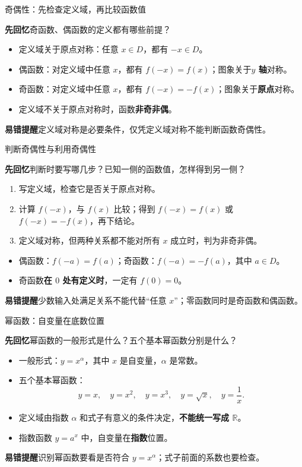\documentclass[UTF8,10pt,aspectratio=169,handout]{ctexbeamer}
\newcommand{\Recall}[1]{\par\noindent\textcolor{KnowledgeBlue}{\textbf{先回忆}\quad #1}\par\vspace{0.3cm}}
\newcommand{\Pitfall}[1]{\par\vspace{0.22cm}\noindent\textbf{易错提醒}\quad #1\par}
\begin{document}
\begin{frame}[t]{奇偶性：先检查定义域，再比较函数值}
\large
\Recall{奇函数、偶函数的定义都有哪些前提？}
\pause
\begin{itemize}
  \item 定义域关于原点对称：任意 $x\in D$，都有 $-x\in D$。
  \item 偶函数：对定义域中任意 $x$，都有 $f(-x)=f(x)$；图象关于\textbf{$y$ 轴}对称。
  \item 奇函数：对定义域中任意 $x$，都有 $f(-x)=-f(x)$；图象关于\textbf{原点}对称。
  \item 定义域不关于原点对称时，函数\textbf{非奇非偶}。
\end{itemize}
\Pitfall{定义域对称是必要条件，仅凭定义域对称不能判断函数奇偶性。}
\end{frame}

\begin{frame}[t]{判断奇偶性与利用奇偶性}
\large
\Recall{判断时要写哪几步？已知一侧的函数值，怎样得到另一侧？}
\pause
\begin{enumerate}
  \item 写定义域，检查它是否关于原点对称。
  \item 计算 $f(-x)$，与 $f(x)$ 比较；得到 $f(-x)=f(x)$ 或 $f(-x)=-f(x)$，再下结论。
  \item 定义域对称，但两种关系都不能对所有 $x$ 成立时，判为非奇非偶。
\end{enumerate}
\begin{itemize}
  \item 偶函数：$f(-a)=f(a)$；奇函数：$f(-a)=-f(a)$，其中 $a\in D$。
  \item 奇函数\textbf{在 $0$ 处有定义时}，一定有 $f(0)=0$。
\end{itemize}
\Pitfall{少数输入处满足关系不能代替“任意 $x$”；零函数同时是奇函数和偶函数。}
\end{frame}

\begin{frame}[t]{幂函数：自变量在底数位置}
\large
\Recall{幂函数的一般形式是什么？五个基本幂函数分别是什么？}
\pause
\begin{itemize}
  \item 一般形式：$y=x^\alpha$，其中 $x$ 是自变量，$\alpha$ 是常数。
  \item 五个基本幂函数：
  \[
    y=x,\quad y=x^2,\quad y=x^3,\quad y=\sqrt{x},\quad y=\frac1x.
  \]
  \item 定义域由指数 $\alpha$ 和式子有意义的条件决定，\textbf{不能统一写成 $\mathbb R$}。
  \item 指数函数 $y=a^x$ 中，自变量在\textbf{指数}位置。
\end{itemize}
\Pitfall{识别幂函数要看是否符合 $y=x^\alpha$；式子前面的系数也要检查。}
\end{frame}
\end{document}
